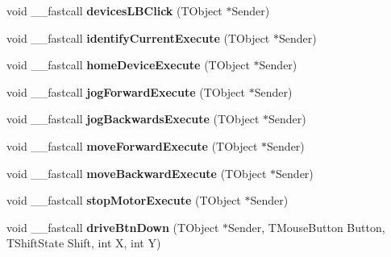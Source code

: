 \begin{DoxyCompactItemize}
\item 
void \+\_\+\+\_\+fastcall {\bfseries devices\+L\+B\+Click} (T\+Object $\ast$Sender)\hypertarget{class_t_main_a4ed6d0ababcd4bd778232a8b89060da5}{}\label{class_t_main_a4ed6d0ababcd4bd778232a8b89060da5}

\item 
void \+\_\+\+\_\+fastcall {\bfseries identify\+Current\+Execute} (T\+Object $\ast$Sender)\hypertarget{class_t_main_adc489b561c90a10cf51c5f4d99faec6a}{}\label{class_t_main_adc489b561c90a10cf51c5f4d99faec6a}

\item 
void \+\_\+\+\_\+fastcall {\bfseries home\+Device\+Execute} (T\+Object $\ast$Sender)\hypertarget{class_t_main_a1ac98570b3c6ca6fbdd66b76d7598b1e}{}\label{class_t_main_a1ac98570b3c6ca6fbdd66b76d7598b1e}

\item 
void \+\_\+\+\_\+fastcall {\bfseries jog\+Forward\+Execute} (T\+Object $\ast$Sender)\hypertarget{class_t_main_afbe995e1a282ed0adf64186c07d9f886}{}\label{class_t_main_afbe995e1a282ed0adf64186c07d9f886}

\item 
void \+\_\+\+\_\+fastcall {\bfseries jog\+Backwards\+Execute} (T\+Object $\ast$Sender)\hypertarget{class_t_main_a099e286f7815755d371b33185192c382}{}\label{class_t_main_a099e286f7815755d371b33185192c382}

\item 
void \+\_\+\+\_\+fastcall {\bfseries move\+Forward\+Execute} (T\+Object $\ast$Sender)\hypertarget{class_t_main_a255b5837603ba1d88942862633795621}{}\label{class_t_main_a255b5837603ba1d88942862633795621}

\item 
void \+\_\+\+\_\+fastcall {\bfseries move\+Backward\+Execute} (T\+Object $\ast$Sender)\hypertarget{class_t_main_a1ae32f9f867a68f1eba80e6f82e7bd0c}{}\label{class_t_main_a1ae32f9f867a68f1eba80e6f82e7bd0c}

\item 
void \+\_\+\+\_\+fastcall {\bfseries stop\+Motor\+Execute} (T\+Object $\ast$Sender)\hypertarget{class_t_main_ab7d25b4f02b73f7e6ccb033f9f03337c}{}\label{class_t_main_ab7d25b4f02b73f7e6ccb033f9f03337c}

\item 
void \+\_\+\+\_\+fastcall {\bfseries drive\+Btn\+Down} (T\+Object $\ast$Sender, T\+Mouse\+Button Button, T\+Shift\+State Shift, int X, int Y)\hypertarget{class_t_main_a03231b5edefa206d3bb67b55ce6fbc77}{}\label{class_t_main_a03231b5edefa206d3bb67b55ce6fbc77}


\end{DoxyCompactItemize}
